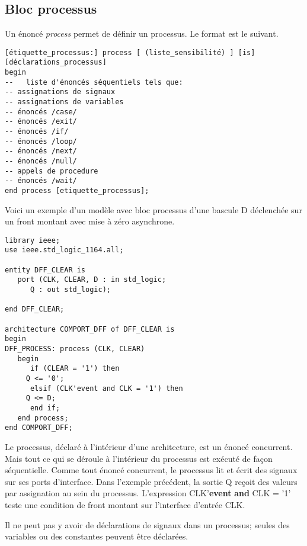\documentclass[11pt]{article}
\begin{document}
\subsection{Bloc processus}
\label{sec:orgeea7b31}

Un énoncé \emph{process} permet de définir un processus. Le format est le
suivant.

\begin{listing}[htbp]
\begin{verbatim}
[étiquette_processus:] process [ (liste_sensibilité) ] [is]
[déclarations_processus]
begin
--   liste d'énoncés séquentiels tels que:
-- assignations de signaux 
-- assignations de variables
-- énoncés /case/
-- énoncés /exit/
-- énoncés /if/ 
-- énoncés /loop/ 
-- énoncés /next/
-- énoncés /null/
-- appels de procedure
-- énoncés /wait/
end process [etiquette_processus];
\end{verbatim}
\caption{Bloc processus}
\end{listing}

Voici un exemple d'un modèle avec bloc processus d'une bascule D
déclenchée sur un front montant avec mise à zéro asynchrone.

\begin{listing}[htbp]
\begin{verbatim}
library ieee;
use ieee.std_logic_1164.all;

entity DFF_CLEAR is
   port (CLK, CLEAR, D : in std_logic;
      Q : out std_logic);

end DFF_CLEAR;

architecture COMPORT_DFF of DFF_CLEAR is
begin
DFF_PROCESS: process (CLK, CLEAR)
   begin
      if (CLEAR = '1') then
	 Q <= '0';
      elsif (CLK'event and CLK = '1') then
	 Q <= D;
      end if;
   end process;
end COMPORT_DFF;
\end{verbatim}
\caption{Bascule D, front montant, mise à zéro asynchrone}
\end{listing}

Le processus, déclaré à l'intérieur d'une architecture, est un énoncé
concurrent.  Mais tout ce qui se déroule à l'intérieur du processus
est exécuté de façon séquentielle. Comme tout énoncé concurrent, le
processus lit et écrit des signaux sur ses ports d'interface. Dans
l'exemple précédent, la sortie Q reçoit des valeurs par assignation au
sein du processus. L'expression CLK'\textbf{event} \textbf{and} CLK = '1' teste une
condition de front montant sur l'interface d'entrée CLK.

Il ne peut pas y avoir de déclarations de signaux dans un processus;
seules des variables ou des constantes peuvent être déclarées.
\end{document}
